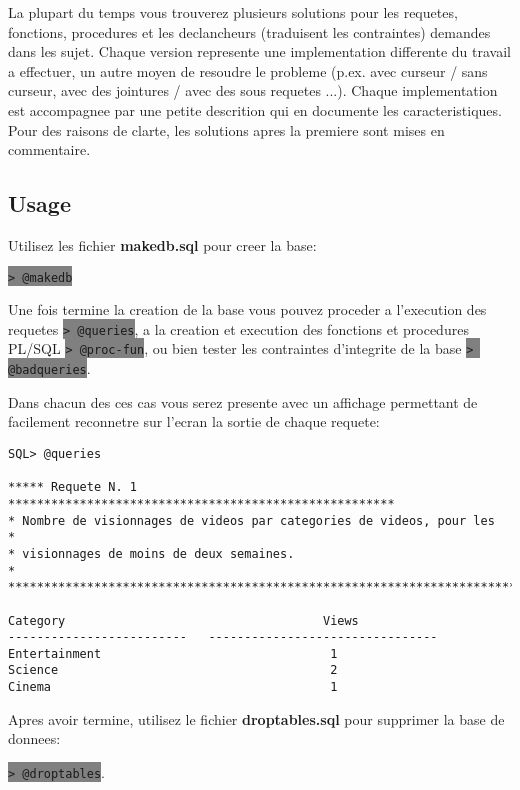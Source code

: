 \documentclass[twoside,openright,a4paper,11pt,french]{article}
\begin{document}
\bigbreak
La plupart du temps vous trouverez plusieurs solutions pour les requetes,
fonctions, procedures et les declancheurs (traduisent les contraintes) demandes
dans les sujet. Chaque version represente une implementation differente du
travail a effectuer, un autre moyen de resoudre le probleme  (p.ex. avec
curseur / sans curseur, avec des jointures / avec des sous requetes ...).
Chaque implementation est accompagnee par une petite descrition qui en
documente les caracteristiques.  Pour des raisons de clarte, les solutions
apres la premiere sont mises en commentaire. 

\subsection{Usage}
Utilisez les fichier {\bf makedb.sql} pour creer la base:
\begin{center}
\colorbox{gray}{\lstinline[basicstyle=\ttfamily\color{black}]|> @makedb|}
\end{center}
Une fois termine la creation de la base vous pouvez proceder a l'execution des
requetes
\colorbox{gray}{\lstinline[basicstyle=\ttfamily\color{black}]|> @queries|},
a la creation et execution des fonctions et procedures PL/SQL
\colorbox{gray}{\lstinline[basicstyle=\ttfamily\color{black}]|> @proc-fun|},
ou bien tester les contraintes d'integrite de la base
\colorbox{gray}{\lstinline[basicstyle=\ttfamily\color{black}]|> @badqueries|}.

\smallbreak
Dans chacun des ces cas vous serez presente avec un affichage permettant de
facilement reconnetre sur l'ecran la sortie de chaque requete:

\begin{lstlisting}
SQL> @queries

***** Requete N. 1 ******************************************************
* Nombre de visionnages de videos par categories de videos, pour les            *
* visionnages de moins de deux semaines.                                        *
*************************************************************************

Category                                    Views
-------------------------   --------------------------------
Entertainment                                1
Science                                      2
Cinema                                       1
\end{lstlisting}

Apres avoir termine, utilisez le fichier {\bf droptables.sql} pour supprimer
la base de donnees:
\begin{center}
\colorbox{gray}{\lstinline[basicstyle=\ttfamily\color{black}]|> @droptables|}.
\end{center}
\end{document}

